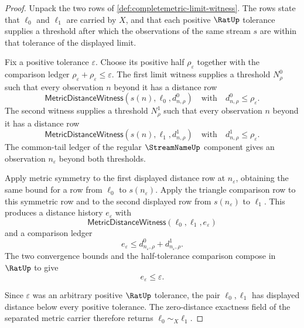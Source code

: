\begin{proof}
Unpack the two rows of \autoref{def:completemetric-limit-witness}. The rows
state that $\ell_0$ and $\ell_1$ are carried by $X$, and that each positive
$\RatUp$ tolerance supplies a threshold after which the observations of the
same stream $s$ are within that tolerance of the displayed limit.

Fix a positive tolerance $\varepsilon$. Choose its positive half
$\rho_{\varepsilon}$ together with the comparison ledger
$\rho_{\varepsilon}+\rho_{\varepsilon}\leq\varepsilon$. The first limit witness
supplies a threshold $N^0_{\rho}$ such that every observation $n$ beyond it has
a distance row
$$
\mathsf{MetricDistanceWitness}(s(n),\ell_0,d^0_{n,\rho})
\quad\text{with}\quad
d^0_{n,\rho}\leq\rho_{\varepsilon}.
$$
The second witness supplies a threshold $N^1_{\rho}$ such that every observation
$n$ beyond it has a distance row
$$
\mathsf{MetricDistanceWitness}(s(n),\ell_1,d^1_{n,\rho})
\quad\text{with}\quad
d^1_{n,\rho}\leq\rho_{\varepsilon}.
$$
The common-tail ledger of the regular $\StreamNameUp$ component gives an
observation $n_{\varepsilon}$ beyond both thresholds.

Apply metric symmetry to the first displayed distance row at
$n_{\varepsilon}$, obtaining the same bound for a row from $\ell_0$ to
$s(n_{\varepsilon})$. Apply the triangle comparison row to this symmetric row
and to the second displayed row from $s(n_{\varepsilon})$ to $\ell_1$. This
produces a distance history $e_{\varepsilon}$ with
$$
\mathsf{MetricDistanceWitness}(\ell_0,\ell_1,e_{\varepsilon})
$$
and a comparison ledger
$$
e_{\varepsilon}\leq d^0_{n_{\varepsilon},\rho}+d^1_{n_{\varepsilon},\rho}.
$$
The two convergence bounds and the half-tolerance comparison compose in
$\RatUp$ to give
$$
e_{\varepsilon}\leq\varepsilon.
$$

Since $\varepsilon$ was an arbitrary positive $\RatUp$ tolerance, the pair
$\ell_0,\ell_1$ has displayed distance below every positive tolerance. The
zero-distance exactness field of the separated metric carrier therefore returns
$\ell_0\sim_X\ell_1$.
\end{proof}

